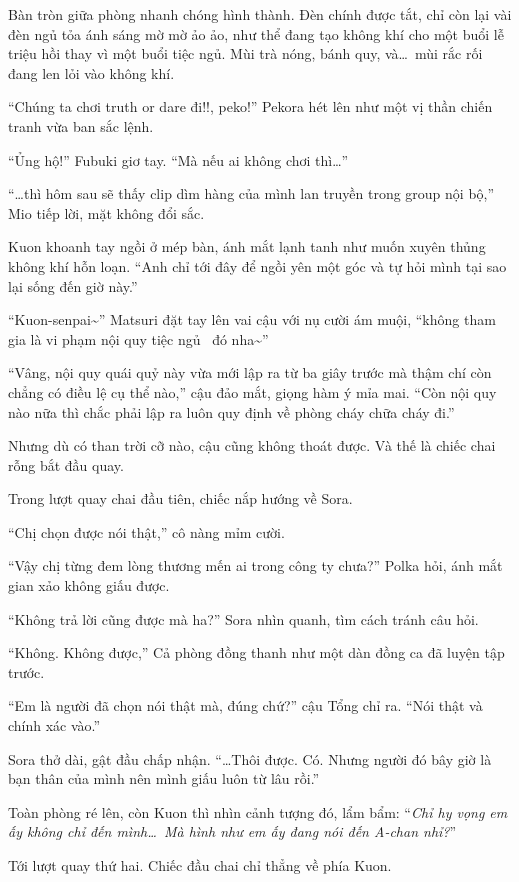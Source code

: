 \documentclass[../main.tex]{subfiles}
\begin{document}
Bàn tròn giữa phòng nhanh chóng hình thành. Đèn chính được tắt, chỉ còn lại vài đèn ngủ tỏa ánh sáng mờ mờ ảo ảo, như thể đang tạo không khí cho một buổi lễ triệu hồi thay vì một buổi tiệc ngủ. Mùi trà nóng, bánh quy, và\dots\ mùi rắc rối đang len lỏi vào không khí.

``Chúng ta chơi truth or dare đi!!, peko!'' Pekora hét lên như một vị thần chiến tranh vừa ban sắc lệnh.

``Ủng hộ!'' Fubuki giơ tay. ``Mà nếu ai không chơi thì\dots''

``\dots thì hôm sau sẽ thấy clip dìm hàng của mình lan truyền trong group nội bộ,'' Mio tiếp lời, mặt không đổi sắc.

Kuon khoanh tay ngồi ở mép bàn, ánh mắt lạnh tanh như muốn xuyên thủng không khí hỗn loạn. ``Anh chỉ tới đây để ngồi yên một góc và tự hỏi mình tại sao lại sống đến giờ này.''

``Kuon-senpai\~{}'' Matsuri đặt tay lên vai cậu với nụ cười ám muội, ``không tham gia là vi phạm nội quy tiệc ngủ \hll\ đó nha\~{}''

``Vâng, nội quy quái quỷ này vừa mới lập ra từ ba giây trước mà thậm chí còn chẳng có điều lệ cụ thể nào,'' cậu đảo mắt, giọng hàm ý mỉa mai. ``Còn nội quy nào nữa thì chắc phải lập ra luôn quy định về phòng cháy chữa cháy đi.''

Nhưng dù có than trời cỡ nào, cậu cũng không thoát được. Và thế là chiếc chai rỗng bắt đầu quay.

Trong lượt quay chai đầu tiên, chiếc nắp hướng về Sora.

``Chị chọn được nói thật,'' cô nàng mỉm cười.

``Vậy chị từng đem lòng thương mến ai trong công ty chưa?'' Polka hỏi, ánh mắt gian xảo không giấu được.

``Không trả lời cũng được mà ha?'' Sora nhìn quanh, tìm cách tránh câu hỏi.

``Không. Không được,'' Cả phòng đồng thanh như một dàn đồng ca đã luyện tập trước.

``Em là người đã chọn nói thật mà, đúng chứ?'' cậu Tổng chỉ ra. ``Nói thật và chính xác vào.''

Sora thở dài, gật đầu chấp nhận. ``\dots Thôi được. Có. Nhưng người đó bây giờ là bạn thân của mình nên mình giấu luôn từ lâu rồi.''

Toàn phòng ré lên, còn Kuon thì nhìn cảnh tượng đó, lẩm bẩm: ``\textit{Chỉ hy vọng em ấy không chỉ đến mình\dots\ Mà hình như em ấy đang nói đến A-chan nhỉ?}''

Tới lượt quay thứ hai. Chiếc đầu chai chỉ thẳng về phía Kuon.
\end{document}
